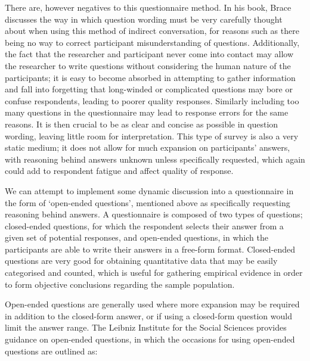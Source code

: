 \documentclass[
  12pt,
  twocolumn]{book}
\begin{document}
There are, however negatives to this questionnaire method. In his book,
Brace discusses the way in which question wording must be very carefully
thought about when using this method of indirect conversation, for
reasons such as there being no way to correct participant
misunderstanding of questions. Additionally, the fact that the
researcher and participant never come into contact may allow the
researcher to write questions without considering the human nature of
the participants; it is easy to become absorbed in attempting to gather
information and fall into forgetting that long-winded or complicated
questions may bore or confuse respondents, leading to poorer quality
responses. Similarly including too many questions in the questionnaire
may lead to response errors for the same reasons. It is then crucial to
be as clear and concise as possible in question wording, leaving little
room for interpretation. This type of survey is also a very static
medium; it does not allow for much expansion on participants' answers,
with reasoning behind answers unknown unless specifically requested,
which again could add to respondent fatigue and affect quality of
response.

We can attempt to implement some dynamic discussion into a questionnaire
in the form of `open-ended questions', mentioned above as specifically
requesting reasoning behind answers. A questionnaire is composed of two
types of questions; closed-ended questions, for which the respondent
selects their answer from a given set of potential responses, and
open-ended questions, in which the participants are able to write their
answers in a free-form format. Closed-ended questions are very good for
obtaining quantitative data that may be easily categorised and counted,
which is useful for gathering empirical evidence in order to form
objective conclusions regarding the sample population.

Open-ended questions are generally used where more expansion may be
required in addition to the closed-form answer, or if using a
closed-form question would limit the answer range. The Leibniz Institute
for the Social Sciences \citep{leibniz} provides guidance on open-ended
questions, in which the occasions for using open-ended questions are
outlined as:
\end{document}
